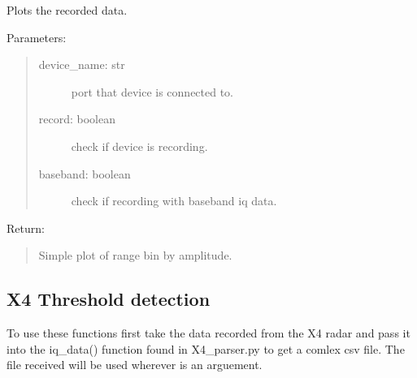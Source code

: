 \documentclass[letterpaper,10pt,english]{sphinxmanual}
\begin{document}
\begin{fulllineitems}
\label{\detokenize{X4 radar:X4_record_playback.simple_xep_plot}}
Plots the recorded data.

Parameters:
\begin{quote}
\begin{description}
\item[{device\_name: str}] \leavevmode
port that device is connected to.

\item[{record: boolean}] \leavevmode
check if device is recording.

\item[{baseband: boolean}] \leavevmode
check if recording with baseband iq data.

\end{description}
\end{quote}

Return:
\begin{quote}

Simple plot of range bin by amplitude.
\end{quote}

\end{fulllineitems}



\subsection{X4 Threshold detection}
\label{\detokenize{X4 radar:x4-threshold-detection}}
To use these functions first take the data recorded from the X4 radar and pass it into the iq\_data() function found in X4\_parser.py to get a comlex csv file. The file received will
be used wherever  is an arguement.

\label{\detokenize{X4 radar:module-X4_threshold}}
\end{document}
